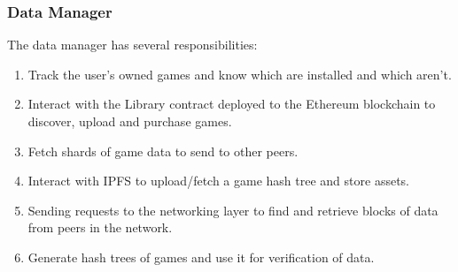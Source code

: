 \subsubsection*{Data Manager}

The data manager has several responsibilities:

\begin{enumerate}
  \item Track the user's owned games and know which are installed and which aren't.
  \item Interact with the Library contract deployed to the Ethereum blockchain to discover, upload and purchase games.
  \item Fetch shards of game data to send to other peers.
  \item Interact with IPFS to upload/fetch a game hash tree and store assets.
  \item Sending requests to the networking layer to find and retrieve blocks of data from peers in the network.
  \item Generate hash trees of games and use it for verification of data.
\end{enumerate}